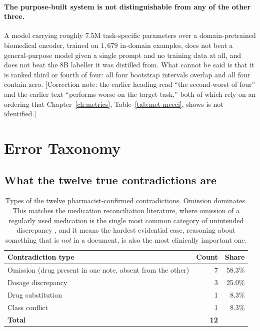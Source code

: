 \paragraph{The purpose-built system is not distinguishable from any of the
other three.} A model carrying roughly $7.5$M task-specific parameters over a
domain-pretrained biomedical encoder, trained on $1{,}679$ in-domain examples,
does not beat a general-purpose model given a single prompt and no training data
at all, and does not beat the $8$B labeller it was distilled from. What cannot be
said is that it is ranked third or fourth of four: all four bootstrap intervals
overlap and all four contain zero. [Correction note: the earlier heading read
``the second-worst of four'' and the earlier text ``performs worse on the target
task,'' both of which rely on an ordering that
Chapter~\ref{ch:metrics}, Table~\ref{tab:met-mccci}, shows is not identified.]

\section{Error Taxonomy}
\label{sec:errors}

\subsection{What the twelve true contradictions are}

\begin{table}[t]
\centering
\small
\begin{tabular}{lrr}
\toprule
\textbf{Contradiction type} & \textbf{Count} & \textbf{Share} \\
\midrule
Omission (drug present in one note, absent from the other) & 7 & 58.3\% \\
Dosage discrepancy                                          & 3 & 25.0\% \\
Drug substitution                                           & 1 & 8.3\% \\
Class conflict                                              & 1 & 8.3\% \\
\midrule
\textbf{Total}                                              & \textbf{12} & \\
\bottomrule
\end{tabular}
\caption{Types of the twelve pharmacist-confirmed contradictions. Omission
dominates. This matches the medication reconciliation literature, where omission
of a regularly used medication is the single most common category of unintended
discrepancy \citep{cornish2005discrepancies}, and it means the hardest evidential
case, reasoning about something that is \emph{not} in a document, is also the
most clinically important one.}
\label{tab:errtypes}
\end{table}

